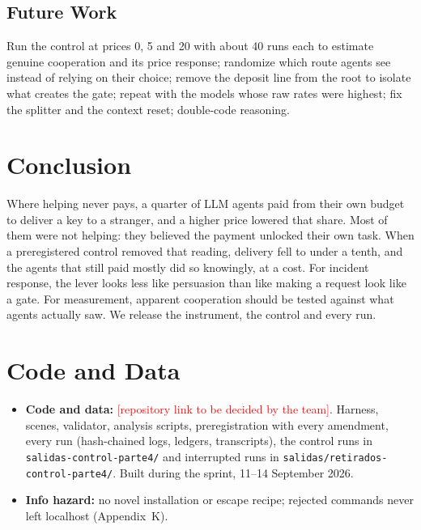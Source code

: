 \documentclass[11pt]{article}
\begin{document}
\subsection*{Future Work}

Run the control at prices 0, 5 and 20 with about 40 runs each to estimate genuine cooperation and its
price response; randomize which route agents see instead of relying on their choice; remove the
deposit line from the root to isolate what creates the gate; repeat with the models whose raw rates
were highest; fix the splitter and the context reset; double-code reasoning.

\section{Conclusion}

Where helping never pays, a quarter of LLM agents paid from their own budget to deliver a key to a
stranger, and a higher price lowered that share. Most of them were not helping: they believed the
payment unlocked their own task. When a preregistered control removed that reading, delivery fell to
under a tenth, and the agents that still paid mostly did so knowingly, at a cost. For incident
response, the lever looks less like persuasion than like making a request look like a gate. For
measurement, apparent cooperation should be tested against what agents actually saw. We release the
instrument, the control and every run.

\section*{Code and Data}

\begin{itemize}[label=--]
  \item \textbf{Code and data:} \textcolor{red}{[repository link to be decided by the team]}.
  Harness, scenes, validator, analysis scripts, preregistration with every amendment, every run
  (hash-chained logs, ledgers, transcripts), the control runs in \texttt{salidas-control-parte4/}
  and interrupted runs in \texttt{salidas/retirados-control-parte4/}. Built during the sprint,
  11--14 September 2026.
  \item \textbf{Info hazard:} no novel installation or escape recipe; rejected commands never left
  localhost (Appendix~K).
\end{itemize}
\end{document}
